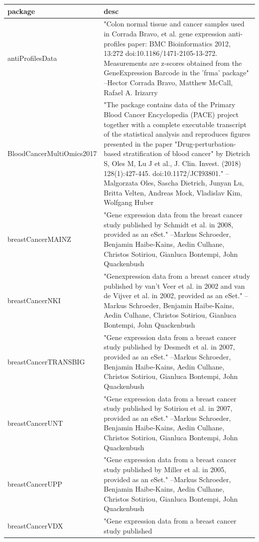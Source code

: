 \begin{longtable}[t]{l>{\raggedright\arraybackslash}p{25em}}
\toprule
package & desc\\
\midrule
antiProfilesData & "Colon normal tissue and cancer samples used in Corrada
Bravo, et al. gene expression anti-profiles paper: BMC
Bioinformatics 2012, 13:272 doi:10.1186/1471-2105-13-272.
Measurements are z-scores obtained from the GeneExpression
Barcode in the 'frma' package" --Hector Corrada Bravo, Matthew McCall, Rafael A. Irizarry\\
BloodCancerMultiOmics2017 & "The package contains data of the Primary Blood Cancer
Encyclopedia (PACE) project together with a complete executable
transcript of the statistical analysis and reproduces figures
presented in the paper "Drug-perturbation-based stratification
of blood cancer" by Dietrich S, Oles M, Lu J et al., J. Clin.
Invest. (2018) 128(1):427-445. doi:10.1172/JCI93801." --Malgorzata Oles, Sascha Dietrich, Junyan Lu, Britta Velten, Andreas Mock, Vladislav Kim, Wolfgang Huber\\
breastCancerMAINZ & "Gene expression data from the breast cancer study
published by Schmidt et al. in 2008, provided as an eSet." --Markus Schroeder, Benjamin Haibe-Kains, Aedin Culhane, Christos Sotiriou, Gianluca Bontempi, John Quackenbush\\
breastCancerNKI & "Genexpression data from a breast cancer study published by
van't Veer et al. in 2002 and van de Vijver et al. in 2002,
provided as an eSet." --Markus Schroeder, Benjamin Haibe-Kains, Aedin Culhane, Christos Sotiriou, Gianluca Bontempi, John Quackenbush\\
breastCancerTRANSBIG & "Gene expression data from a breast cancer study published
by Desmedt et al. in 2007, provided as an eSet." --Markus Schroeder, Benjamin Haibe-Kains, Aedin Culhane, Christos Sotiriou, Gianluca Bontempi, John Quackenbush\\
\addlinespace
breastCancerUNT & "Gene expression data from a breast cancer study published
by Sotiriou et al. in 2007, provided as an eSet." --Markus Schroeder, Benjamin Haibe-Kains, Aedin Culhane, Christos Sotiriou, Gianluca Bontempi, John Quackenbush\\
breastCancerUPP & "Gene expression data from a breast cancer study published
by Miller et al. in 2005, provided as an eSet." --Markus Schroeder, Benjamin Haibe-Kains, Aedin Culhane, Christos Sotiriou, Gianluca Bontempi, John Quackenbush\\
breastCancerVDX & "Gene expression data from a breast cancer study published

\end{longtable}
